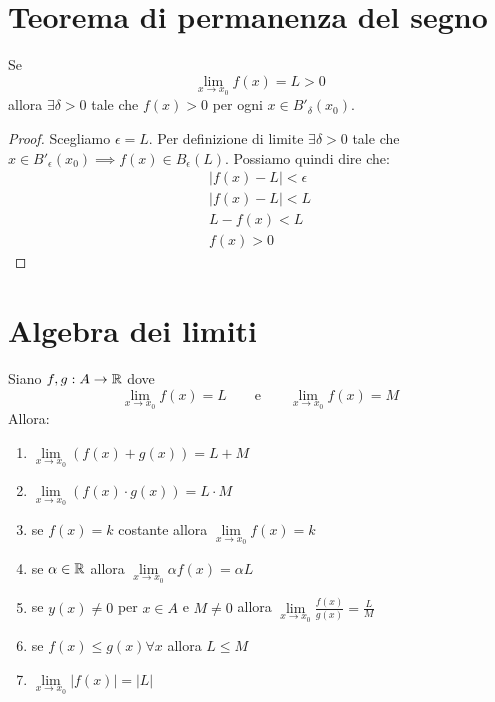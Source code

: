 \section{Teorema di permanenza del segno}

\begin{theorem}
Se 
\begin{equation*}
\lim_{x \to x_0} f(x) = L > 0
\end{equation*}
allora $\exists \delta > 0$ tale che $f(x) > 0$ per ogni $x \in B'_\delta (x_0)$.
\end{theorem}

\begin{proof}
Scegliamo $\epsilon = L$. Per definizione di limite $\exists \delta > 0$ tale che $x \in B'_\epsilon (x_0) \implies f(x) \in B_\epsilon (L)$. Possiamo quindi dire che:
\begin{gather*}
|f(x) - L| < \epsilon \\
|f(x) - L| < L \\
L - f(x) < L \\
f(x) > 0
\end{gather*}
\end{proof}

\section{Algebra dei limiti}

\begin{theorem}
Siano $f, g : A \to \mathbb R$ dove
\begin{equation*}
\lim_{x \to x_0} f(x) = L \qquad \text{e} \qquad \lim_{x \to x_0} f(x) = M
\end{equation*}
Allora:
\begin{enumerate}
\item $\lim\limits_{x \to x_0} (f(x) + g(x)) = L + M$
\item $\lim\limits_{x \to x_0} (f(x) \cdot g(x)) = L \cdot M$
\item se $f(x) = k$ costante allora $\lim\limits_{x \to x_0} f(x) = k$
\item se $\alpha \in \mathbb R$ allora $\lim\limits_{x \to x_0} \alpha f(x) = \alpha L$
\item se $y(x) \neq 0$ per $x \in A$ e $M \neq 0$ allora
$\lim\limits_{x \to x_0} \frac{f(x)}{g(x)} = \frac{L}{M}$
\item se $f(x) \le g(x) \forall x$ allora $L \le M$
\item $\lim\limits_{x \to x_0} |f(x)| = |L|$
\end{enumerate}
\end{theorem}

